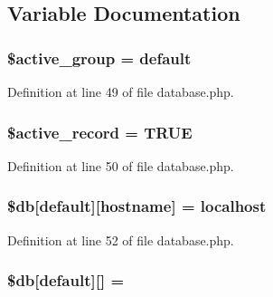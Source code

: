 \subsection{Variable Documentation}
\subsubsection[{\texorpdfstring{\$active\+\_\+group}{$active_group}}]{\setlength{\rightskip}{0pt plus 5cm}\$active\+\_\+group = \textquotesingle{}default\textquotesingle{}}\hypertarget{database_8php_a5046ea83a698c5b7bbf6ffd3dd816b65}{}\label{database_8php_a5046ea83a698c5b7bbf6ffd3dd816b65}


Definition at line 49 of file database.\+php.

\subsubsection[{\texorpdfstring{\$active\+\_\+record}{$active_record}}]{\setlength{\rightskip}{0pt plus 5cm}\$active\+\_\+record = T\+R\+UE}\hypertarget{database_8php_a228b6ea91602f48a8831d0dc94809b94}{}\label{database_8php_a228b6ea91602f48a8831d0dc94809b94}


Definition at line 50 of file database.\+php.

\subsubsection[{\texorpdfstring{\$db}{$db}}]{\setlength{\rightskip}{0pt plus 5cm}\$db\mbox{[}\textquotesingle{}default\textquotesingle{}\mbox{]}\mbox{[}\textquotesingle{}hostname\textquotesingle{}\mbox{]} = \textquotesingle{}localhost\textquotesingle{}}\hypertarget{database_8php_a987b8cb0ae83b9519cb7c36fe25dbdd8}{}\label{database_8php_a987b8cb0ae83b9519cb7c36fe25dbdd8}


Definition at line 52 of file database.\+php.

\subsubsection[{\texorpdfstring{\$db}{$db}}]{\setlength{\rightskip}{0pt plus 5cm}\$db\mbox{[}\textquotesingle{}default\textquotesingle{}\mbox{]}\mbox{[}\textquotesingle{}\mbox{]} = \textquotesingle{}\textquotesingle{}}\hypertarget{database_8php_a2f535f16fa00521992cfc791c8dcec37}{}\label{database_8php_a2f535f16fa00521992cfc791c8dcec37}


